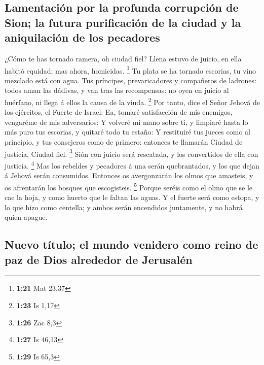 \hypertarget{lamentaciuxf3n-por-la-profunda-corrupciuxf3n-de-sion-la-futura-purificaciuxf3n-de-la-ciudad-y-la-aniquilaciuxf3n-de-los-pecadores}{%
\subsection{Lamentación por la profunda corrupción de Sion; la futura
purificación de la ciudad y la aniquilación de los
pecadores}\label{lamentaciuxf3n-por-la-profunda-corrupciuxf3n-de-sion-la-futura-purificaciuxf3n-de-la-ciudad-y-la-aniquilaciuxf3n-de-los-pecadores}}

 ¿Cómo te has tornado ramera, oh ciudad fiel? Llena estuvo
de juicio, en ella habitó equidad; mas ahora, homicidas. \footnote{\textbf{1:21}
  Mat 23,37}  Tu plata se ha tornado escorias, tu vino
mezclado está con agua.  Tus príncipes, prevaricadores y
compañeros de ladrones: todos aman las dádivas, y van tras las
recompensas: no oyen en juicio al huérfano, ni llega á ellos la causa de
la viuda. \footnote{\textbf{1:23} Is 1,17}  Por tanto, dice
el Señor Jehová de los ejércitos, el Fuerte de Israel: Ea, tomaré
satisfacción de mis enemigos, vengaréme de mis adversarios:
 Y volveré mi mano sobre ti, y limpiaré hasta lo más puro
tus escorias, y quitaré todo tu estaño:  Y restituiré tus
jueces como al principio, y tus consejeros como de primero: entonces te
llamarán Ciudad de justicia, Ciudad fiel. \footnote{\textbf{1:26} Zac
  8,3}  Sión con juicio será rescatada, y los convertidos
de ella con justicia. \footnote{\textbf{1:27} Is 46,13} 
Mas los rebeldes y pecadores á una serán quebrantados, y los que dejan á
Jehová serán consumidos.  Entonces os avergonzarán los
olmos que amasteis, y os afrentarán los bosques que escogisteis.
\footnote{\textbf{1:29} Is 65,3}  Porque seréis como el
olmo que se le cae la hoja, y como huerto que le faltan las aguas.
 Y el fuerte será como estopa, y lo que hizo como centella;
y ambos serán encendidos juntamente, y no habrá quien apague.

\hypertarget{nuevo-tuxedtulo-el-mundo-venidero-como-reino-de-paz-de-dios-alrededor-de-jerusaluxe9n}{%
\subsection{Nuevo título; el mundo venidero como reino de paz de Dios
alrededor de
Jerusalén}\label{nuevo-tuxedtulo-el-mundo-venidero-como-reino-de-paz-de-dios-alrededor-de-jerusaluxe9n}}

